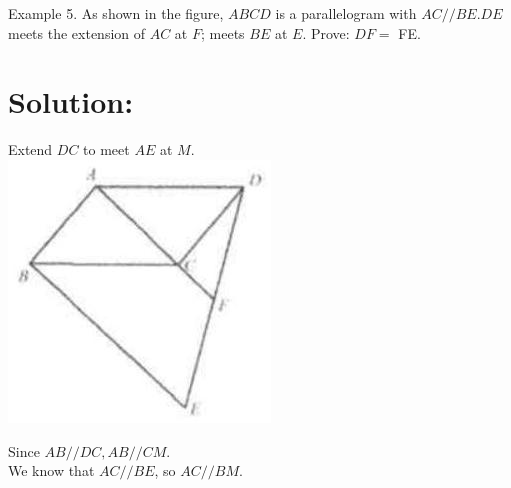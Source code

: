 \documentclass[10pt]{article}
\begin{document}
Example 5. As shown in the figure, \(A B C D\) is a parallelogram with \(A C / / B E . D E\) meets the extension of \(A C\) at \(F\); meets \(B E\) at \(E\). Prove: \(D F=\) FE.

\section*{Solution:}
Extend \(D C\) to meet \(A E\) at \(M\).\\
\includegraphics[max width=\textwidth, center]{2025_04_17_97bc1f7e44d93c271a88g-037}

Since \(A B / / D C, A B / / C M\).\\
We know that \(A C / / B E\), so \(A C / / B M\).
\end{document}
